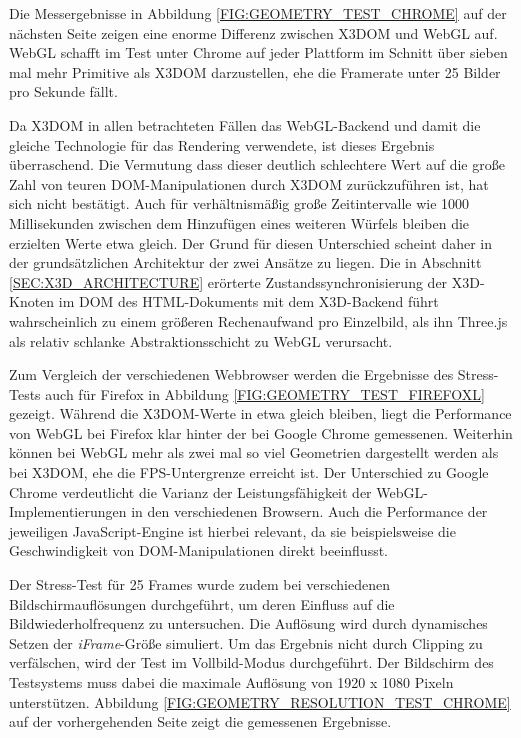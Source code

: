 Die Messergebnisse in Abbildung \ref{FIG:GEOMETRY_TEST_CHROME} auf der nächsten Seite zeigen eine enorme Differenz zwischen X3DOM und WebGL auf. WebGL schafft im Test unter Chrome auf jeder Plattform im Schnitt über sieben mal mehr Primitive als X3DOM darzustellen, ehe die Framerate unter 25 Bilder pro Sekunde fällt.

Da X3DOM in allen betrachteten Fällen das WebGL-Backend und damit die gleiche Technologie für das Rendering verwendete, ist dieses Ergebnis überraschend.
Die Vermutung dass dieser deutlich schlechtere Wert auf die große Zahl von teuren DOM-Manipulationen durch X3DOM zurückzuführen ist, hat sich nicht bestätigt. Auch für verhältnismäßig große Zeitintervalle wie 1000 Millisekunden zwischen dem Hinzufügen eines weiteren Würfels bleiben die erzielten Werte etwa gleich. Der Grund für diesen Unterschied scheint daher in der grundsätzlichen Architektur der zwei Ansätze zu liegen. Die in Abschnitt \ref{SEC:X3D_ARCHITECTURE} erörterte Zustandssynchronisierung der X3D-Knoten im DOM des HTML-Dokuments mit dem X3D-Backend führt wahrscheinlich zu einem größeren Rechenaufwand pro Einzelbild, als ihn Three.js als relativ schlanke Abstraktionsschicht zu WebGL verursacht.

Zum Vergleich der verschiedenen Webbrowser werden die Ergebnisse des Stress-Tests auch für Firefox in Abbildung \ref{FIG:GEOMETRY_TEST_FIREFOXL} gezeigt. Während die X3DOM-Werte in etwa gleich bleiben, liegt die Performance von WebGL bei Firefox klar hinter der bei Google Chrome gemessenen. Weiterhin können bei WebGL mehr als zwei mal so viel Geometrien dargestellt werden als bei X3DOM, ehe die FPS-Untergrenze erreicht ist.
Der Unterschied zu Google Chrome verdeutlicht die Varianz der Leistungsfähigkeit der WebGL-Implementierungen in den verschiedenen Browsern. Auch die Performance der jeweiligen JavaScript-Engine ist hierbei relevant, da sie beispielsweise die Geschwindigkeit von DOM-Manipulationen direkt beeinflusst.

Der Stress-Test für 25 Frames wurde zudem bei verschiedenen Bildschirmauflösungen durchgeführt, um deren Einfluss auf die Bildwiederholfrequenz zu untersuchen. Die Auflösung wird durch dynamisches Setzen der \emph{iFrame}-Größe simuliert. Um das Ergebnis nicht durch Clipping zu verfälschen, wird der Test im Vollbild-Modus durchgeführt. Der Bildschirm des Testsystems muss dabei die maximale Auflösung von 1920 x 1080 Pixeln unterstützen. Abbildung \ref{FIG:GEOMETRY_RESOLUTION_TEST_CHROME} auf der vorhergehenden Seite zeigt die gemessenen Ergebnisse.

